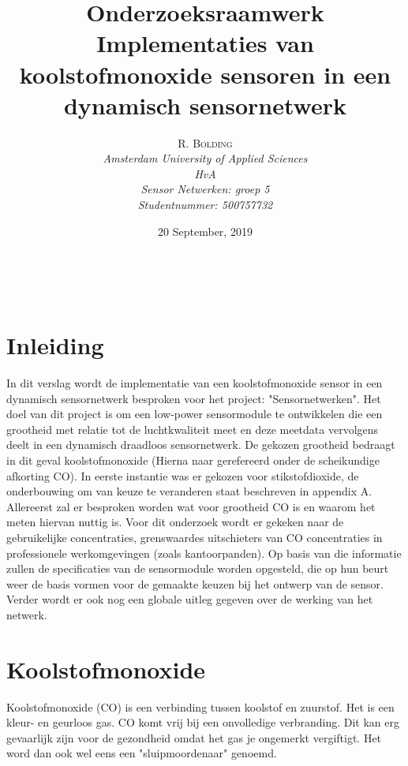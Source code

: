 \documentclass[a4paper, 11pt]{article} %
\title{\textbf{Onderzoeksraamwerk}\\ %
Implementaties van koolstofmonoxide sensoren in een dynamisch sensornetwerk} %
\author{\textsc{R. Bolding} %
\\{\textit{Amsterdam University of Applied Sciences\\ 
HvA\\
Sensor Netwerken: groep 5\\
Studentnummer: 500757732}}} %
\date{20 September, 2019} %
\makeatletter
\renewcommand{\maketitle}{ %
\begin{flushright} %
{\LARGE\@title} %

\vspace{50pt} %

{\large\@author} %
\\\@date %

\vspace{40pt} %
\end{flushright}
}
\makeatother
\begin{document}
\captionsetup{justification=centering}
\renewcommand{\contentsname}{Inhoudsopgave}
\hypersetup{hidelinks=true}
\maketitle %




\vspace{10pt} %

\newpage
\tableofcontents
\newpage
\section{Inleiding}
In dit verslag wordt de implementatie van een koolstofmonoxide sensor in een dynamisch sensornetwerk besproken voor het project: "Sensornetwerken". Het doel van dit project is om een low-power sensormodule te ontwikkelen die een grootheid met relatie tot de luchtkwaliteit meet en deze meetdata vervolgens deelt in een dynamisch draadloos sensornetwerk. De gekozen grootheid bedraagt in dit geval koolstofmonoxide (Hierna naar gerefereerd onder de scheikundige afkorting CO). In eerste instantie was er gekozen voor stikstofdioxide, de onderbouwing om van keuze te veranderen staat beschreven in appendix A. Allereerst zal er besproken worden wat voor grootheid CO is en waarom het meten hiervan nuttig is. Voor dit onderzoek wordt er gekeken naar de gebruikelijke concentraties, grenswaardes uitschieters van CO concentraties in professionele werkomgevingen (zoals kantoorpanden). Op basis van die informatie zullen de specificaties van de sensormodule worden opgesteld, die op hun beurt weer de basis vormen voor de gemaakte keuzen bij het ontwerp van de sensor. Verder wordt er ook nog een globale uitleg gegeven over de werking van het netwerk.

\section{Koolstofmonoxide}
Koolstofmonoxide (CO) is een verbinding tussen koolstof en zuurstof. Het is een kleur- en geurloos gas. CO komt vrij bij een onvolledige verbranding. Dit kan erg gevaarlijk zijn voor de gezondheid omdat het gas je ongemerkt vergiftigt. Het word dan ook wel eens een "sluipmoordenaar" genoemd. 
\end{document}

